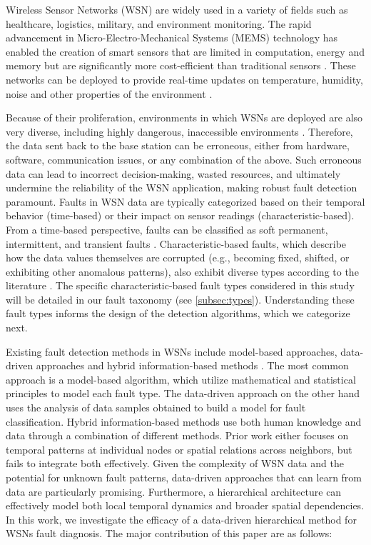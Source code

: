 Wireless Sensor Networks (WSN) are widely used in a variety of fields such as healthcare, logistics, military, and environment monitoring. The rapid advancement in Micro-Electro-Mechanical Systems (MEMS) technology has enabled the creation of smart sensors that are limited in computation, energy and memory but are significantly more cost-efficient than traditional sensors \cite{Yick2008, Chai2020, Hussain2021}. These networks can be deployed to provide real-time updates on temperature, humidity, noise and other properties of the environment \cite{Yick2008, Chai2020, Ullo2020}.

Because of their proliferation, environments in which WSNs are deployed are also very diverse, including highly dangerous, inaccessible environments \cite{Prasad2023}. Therefore, the data sent back to the base station can be erroneous, either from hardware, software, communication issues, or any combination of the above. Such erroneous data can lead to incorrect decision-making, wasted resources, and ultimately undermine the reliability of the WSN application, making robust fault detection paramount. Faults in WSN data are typically categorized based on their temporal behavior (time-based) or their impact on sensor readings (characteristic-based). From a time-based perspective, faults can be classified as soft permanent, intermittent, and transient faults \cite{Prasad2023}. Characteristic-based faults, which describe how the data values themselves are corrupted (e.g., becoming fixed, shifted, or exhibiting other anomalous patterns), also exhibit diverse types according to the literature \cite{Shi2024, Saeed2021, Ni2009, Hasan2024}. The specific characteristic-based fault types considered in this study will be detailed in our fault taxonomy (see \ref{subsec:types}). Understanding these fault types informs the design of the detection algorithms, which we categorize next.

Existing fault detection methods in WSNs include model-based approaches, data-driven approaches and hybrid information-based methods \cite{Shi2024}. The most common approach is a model-based algorithm, which utilize mathematical and statistical principles to model each fault type. The data-driven approach on the other hand uses the analysis of data samples obtained to build a model for fault classification. Hybrid information-based methods use both human knowledge and data through a combination of different methods. Prior work either focuses on temporal patterns at individual nodes or spatial relations across neighbors, but fails to integrate both effectively. Given the complexity of WSN data and the potential for unknown fault patterns, data-driven approaches that can learn from data are particularly promising. Furthermore, a hierarchical architecture can effectively model both local temporal dynamics and broader spatial dependencies. In this work, we investigate the efficacy of a data-driven hierarchical method for WSNs fault diagnosis. The major contribution of this paper are as follows:

